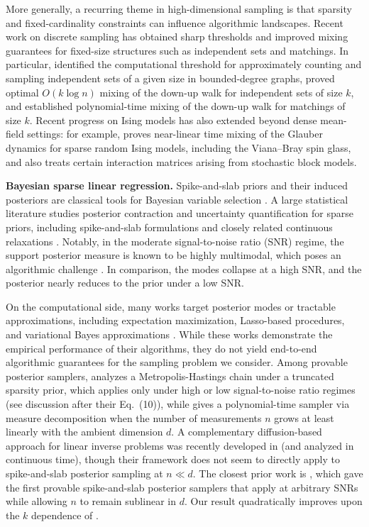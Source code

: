 \documentclass[11pt]{article}
\newcommand{\1}{\mathbf{1}}
\newcommand{\0}{\mathbf{0}}
\begin{document}
More generally, a recurring theme in high-dimensional sampling is that sparsity and fixed-cardinality
constraints can influence algorithmic landscapes. 
Recent work on discrete sampling has obtained sharp thresholds and improved mixing guarantees for fixed-size
structures such as independent sets and matchings. In particular, \cite{DP21} identified the
computational threshold for approximately counting and sampling independent sets of a given
size in bounded-degree graphs, \cite{JMPV23} proved optimal \(O(k\log n)\) mixing of the
down-up walk for independent sets of size \(k\), and
\cite{JM24} established polynomial-time mixing of the down-up walk for matchings of size $k$. Recent progress on Ising models has also extended beyond dense mean-field settings: for example, \cite{LiuMRW24} proves near-linear time mixing of the Glauber dynamics for sparse random Ising models, including the Viana--Bray spin glass, and also treats certain interaction matrices arising from stochastic block models. 

\textbf{Bayesian sparse linear regression.} Spike-and-slab priors and their induced posteriors are classical tools for Bayesian variable selection \cite{MitchellB88,GeorgeM93}. A
large statistical literature studies posterior contraction and uncertainty quantification for sparse
priors, including spike-and-slab formulations and closely related continuous relaxations
\cite{CSHVdV15,Roc18}. 
Notably, in the moderate signal-to-noise ratio (SNR) regime, the support posterior measure is known to be highly multimodal, which poses an algorithmic challenge \cite{CSHVdV15}. In comparison, the modes collapse at a high SNR, and the posterior nearly reduces to the prior under a low SNR.

On the computational side, many works target posterior modes or
tractable approximations, including expectation maximization, Lasso-based procedures, and variational Bayes
approximations \cite{RG14,RG18,RS22,MS22}. While these works demonstrate the empirical performance of their algorithms, they do
not yield end-to-end algorithmic guarantees for the sampling problem we consider. Among provable posterior
samplers, \cite{YangWJ16} analyzes a Metropolis-Hastings chain under a truncated sparsity prior, which applies only under high or low signal-to-noise ratio regimes (see discussion after their Eq.\ (10)), while \cite{MontanariW26} gives a
polynomial-time sampler via measure decomposition when the number of measurements $n$ grows at
least linearly with the ambient dimension $d$. A complementary diffusion-based approach for linear inverse
problems was recently developed in \cite{BrunaH24} (and analyzed in continuous time), though their framework does not seem to directly apply to spike-and-slab posterior sampling at $n \ll d$.
 The closest prior work is \cite{KumarSTZ25}, which
gave the first provable spike-and-slab posterior samplers that apply at arbitrary SNRs while
allowing $n$ to remain sublinear in \(d\). Our result quadratically improves upon the $k$ dependence of \cite{KumarSTZ25}.
\end{document}
